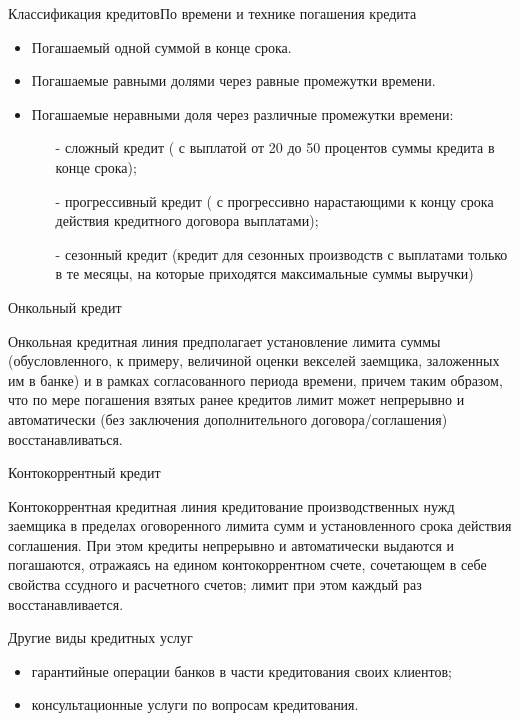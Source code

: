 \documentclass[_DKB_p2_Credit.tex]{subfiles}
\begin{document}
\begin{frame}[allowframebreaks]{Классификация кредитов}{По времени и технике погашения кредита}
\begin{itemize}
\item
Погашаемый одной суммой в конце срока.
\item
Погашаемые равными долями через равные промежутки времени.

\pagebreak
\item
Погашаемые неравными доля через различные промежутки времени:
\begin{enumerate}
\item[-]
сложный кредит ( с выплатой от 20 до 50 процентов суммы кредита в конце срока);
\item[-]
прогрессивный кредит ( с прогрессивно нарастающими к концу срока действия кредитного договора выплатами);
\item[-]
сезонный кредит (кредит для сезонных производств с выплатами только в те месяцы, на которые приходятся максимальные суммы выручки)
\end{enumerate}
\end{itemize}
\end{frame}
\begin{frame}{Онкольный кредит}
\begin{block}{Онкольная кредитная линия} 
\quad
предполагает установление лимита суммы (обусловленного, к примеру, величиной оценки векселей заемщика, заложенных им в банке) и в рамках согласованного периода времени, причем таким образом, что по мере погашения взятых ранее кредитов лимит может непрерывно и автоматически (без заключения дополнительного договора/соглашения) восстанавливаться.
\end{block}
\end{frame}
\begin{frame}{Контокоррентный кредит}
\begin{block}{Контокоррентная кредитная линия }
\quad
кредитование производственных нужд заемщика в пределах оговоренного лимита сумм и установленного срока действия соглашения. При этом кредиты непрерывно и автоматически выдаются и погашаются, отражаясь на едином контокоррентном счете, сочетающем в себе свойства ссудного и расчетного счетов; лимит при этом каждый раз восстанавливается.
\end{block}
\end{frame}
\begin{frame}{Другие виды кредитных услуг}
\begin{itemize}
\item
гарантийные операции банков в части кредитования своих клиентов;
\item
консультационные услуги по вопросам кредитования.
\end{itemize}
\end{frame}
\end{document}
